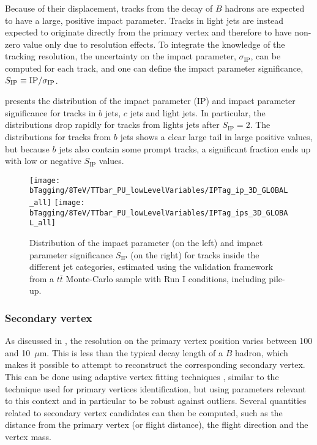     Because of their displacement, tracks from the decay of $B$ hadrons are
    expected to have a large, positive impact parameter. Tracks in light jets
    are instead expected to originate directly from the primary vertex and
    therefore to have non-zero value only due to resolution effects. To
    integrate the knowledge of the tracking resolution, the uncertainty on the
    impact parameter, $\sigma_\text{IP}$, can be computed for each track, and
    one can define the impact parameter significance, $S_\text{IP} \equiv
    \text{IP}/\sigma_\text{IP}$.

     presents the distribution of the
    impact parameter (IP) and impact parameter significance for tracks in $b$
    jets, $c$ jets and light jets. In particular, the distributions drop rapidly
    for tracks from lights jets after $S_\text{IP} = 2$. The distributions for
    tracks from $b$ jets shows a clear large tail in large positive values, but
    because $b$ jets also contain some prompt tracks, a significant fraction
    ends up with low or negative $S_\text{IP}$ values.

    \begin{figure}[th!]
        \centering
        \begin{minipage}{\textwidth}
        \texttt{[image: bTagging/8TeV/TTbar\_PU\_lowLevelVariables/IPTag\_ip\_3D\_GLOBAL\_all]}
        \texttt{[image: bTagging/8TeV/TTbar\_PU\_lowLevelVariables/IPTag\_ips\_3D\_GLOBAL\_all]}
        \end{minipage}
        \caption{Distribution of the impact parameter (on the left) and impact
        parameter significance $S_\text{IP}$ (on the right) for tracks inside
        the different jet categories, estimated using the validation framework
        from a $t\bar{t}$ Monte-Carlo sample with Run I conditions, including
        pile-up.}
        \label{fig:bTagging/impactParameterDistr}
    \end{figure}

    \subsubsection{Secondary vertex}

    As discussed in , the resolution on the
    primary vertex position varies between 100 and 10~$\mu$m. This is less than
    the typical decay length of a $B$ hadron, which makes it possible to attempt
    to reconstruct the corresponding secondary vertex. This can be done using
    adaptive vertex fitting techniques \cite{AdaptiveVertexFitting}, similar to
    the technique used for primary vertices identification, but using parameters
    relevant to this context and in particular to be robust against outliers.
    Several quantities related to secondary vertex candidates can then be
    computed, such as the distance from the primary vertex (or flight distance),
    the flight direction and the vertex mass.

